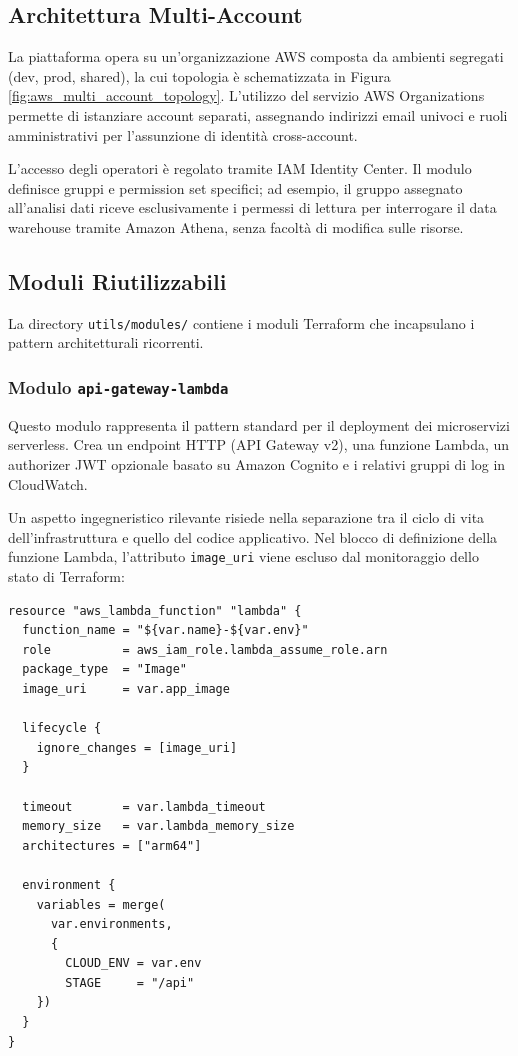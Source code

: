 \subsection{Architettura Multi-Account}

La piattaforma opera su un'organizzazione AWS composta da ambienti segregati (dev, prod, shared), la cui topologia è schematizzata in Figura \ref{fig:aws_multi_account_topology}. L'utilizzo del servizio AWS Organizations permette di istanziare account separati, assegnando indirizzi email univoci e ruoli amministrativi per l'assunzione di identità cross-account.

L'accesso degli operatori è regolato tramite IAM Identity Center. Il modulo definisce gruppi e permission set specifici; ad esempio, il gruppo assegnato all'analisi dati riceve esclusivamente i permessi di lettura per interrogare il data warehouse tramite Amazon Athena, senza facoltà di modifica sulle risorse.

\subsection{Moduli Riutilizzabili}

La directory \texttt{utils/modules/} contiene i moduli Terraform che incapsulano i pattern architetturali ricorrenti.

\subsubsection{Modulo \texttt{api-gateway-lambda}}

Questo modulo rappresenta il pattern standard per il deployment dei microservizi serverless. Crea un endpoint HTTP (API Gateway v2), una funzione Lambda, un authorizer JWT \cite{JWT} opzionale basato su Amazon Cognito e i relativi gruppi di log in CloudWatch.

Un aspetto ingegneristico rilevante risiede nella separazione tra il ciclo di vita dell'infrastruttura e quello del codice applicativo. Nel blocco di definizione della funzione Lambda, l'attributo \texttt{image\_uri} viene escluso dal monitoraggio dello stato di Terraform:

\begin{lstlisting}[language=HCL]
resource "aws_lambda_function" "lambda" {
  function_name = "${var.name}-${var.env}"
  role          = aws_iam_role.lambda_assume_role.arn
  package_type  = "Image"
  image_uri     = var.app_image

  lifecycle {
    ignore_changes = [image_uri]
  }

  timeout       = var.lambda_timeout
  memory_size   = var.lambda_memory_size
  architectures = ["arm64"]

  environment {
    variables = merge(
      var.environments,
      {
        CLOUD_ENV = var.env
        STAGE     = "/api"
    })
  }
}
\end{lstlisting}

